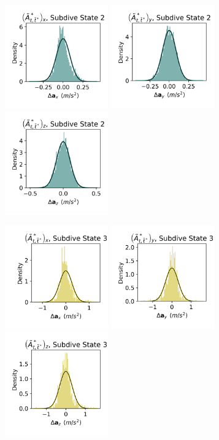 \documentclass{article}
\begin{document}
\begin{center}
        \includegraphics[width=1.75in]{../Plots/CarHMM_empirical_hist_Ax_1.png}
        \includegraphics[width=1.75in]{../Plots/CarHMM_empirical_hist_Ay_1.png}
        \includegraphics[width=1.75in]{../Plots/CarHMM_empirical_hist_Az_1.png}
        
        \includegraphics[width=1.75in]{../Plots/CarHMM_empirical_hist_Ax_2.png}
        \includegraphics[width=1.75in]{../Plots/CarHMM_empirical_hist_Ay_2.png}
        \includegraphics[width=1.75in]{../Plots/CarHMM_empirical_hist_Az_2.png}
        

\end{center}
\end{document}
